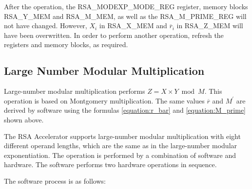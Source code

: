 \documentclass[main\_\_EN.tex]{subfiles}
\begin{document}
After the operation, the RSA\_MODEXP\_MODE\_REG register, memory blocks RSA\_Y\_MEM and RSA\_M\_MEM, as well as the RSA\_M\_PRIME\_REG will not have changed. However, \begin{math}X_{i}\end{math} in RSA\_X\_MEM and \begin{math}\overline{r}_{i}\end{math} in RSA\_Z\_MEM will have been overwritten. In order to perform another operation, refresh the registers and memory blocks, as required.

\subsection{Large Number Modular Multiplication}

Large-number modular multiplication performs \begin{math}Z = X \times Y \bmod M\end{math}. This operation is based on Montgomery multiplication. The same values \begin{math}\overline{r}\end{math} and
\begin{math}M^{\prime}\end{math} are derived by software using the formulas \ref{equation:r_bar} and \ref{equation:M_prime} shown above.

The RSA Accelerator supports large-number modular multiplication with eight different operand lengths, which are the same as in the large-number modular exponentiation. The operation is performed by a combination of software and hardware. The software performs two hardware operations in sequence.

The software process is as follows:
\end{document}
